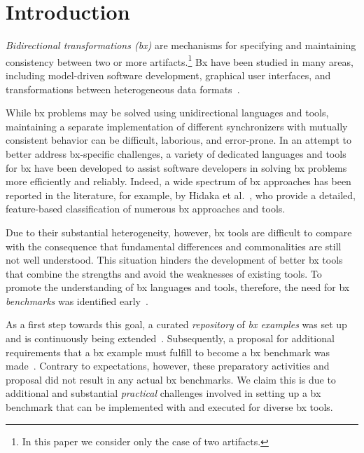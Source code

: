 \section{Introduction}
\label{sec:Introduction}

\emph{Bidirectional transformations (bx)} are mechanisms for specifying and maintaining consistency between two or more artifacts.\footnote{In this paper we consider only the case of two artifacts.} 
Bx have been studied in many areas, including model-driven software development, graphical user interfaces, and transformations between heterogeneous data formats~\cite{ICMT2009-Czarnecki}.

While bx problems may be solved using unidirectional languages and tools, maintaining a separate implementation of different synchronizers with mutually consistent behavior can be difficult, laborious, and error-prone. 
In an attempt to better address bx-specific challenges, a variety of dedicated languages and tools for bx have been developed to assist software developers in solving bx problems more efficiently and reliably. 
Indeed, a wide spectrum of bx approaches has been reported in the literature, for example, by Hidaka et al.~\cite{SOSYM-Hidaka2016}, who provide a detailed, feature-based classification of numerous bx approaches and tools.

Due to their substantial heterogeneity, however, bx tools are difficult to compare with the consequence that fundamental differences and commonalities are still not well understood.
This situation hinders the development of better bx tools that combine the strengths and avoid the weaknesses of existing tools.
To promote the understanding of bx languages and tools, therefore, the need for bx \emph{benchmarks} was identified early~\cite{ICMT2009-Czarnecki}. 

As a first step towards this goal, a curated \emph{repository} of \emph{bx examples} was set up and is continuously being extended~\cite{Cheney2014}.
Subsequently, a proposal for additional requirements that a bx example must fulfill to become a bx benchmark was made~\cite{AnjorinCG0RS14}. 
%
Contrary to expectations, however, these preparatory activities and proposal did not result in any actual bx benchmarks.
We claim this is due to additional and substantial \emph{practical} challenges involved in setting up a bx benchmark that can be implemented with and executed for diverse bx tools.

